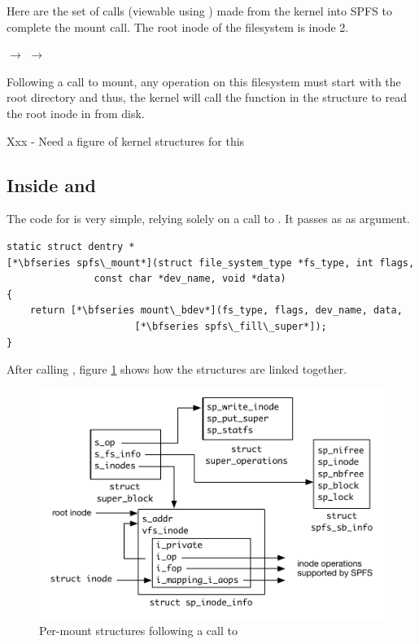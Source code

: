 Here are the set of calls (viewable using ) made from the kernel into SPFS to complete the mount call. The root inode of the filesystem is inode 2.

\small
\bigskip
{} $\rightarrow$   $\rightarrow$ 

\bigskip
\normalsize
\noindent
Following a call to mount, any operation on this filesystem must start with the root directory and thus, the kernel will call the  function in the  structure to read the root inode in from disk.

Xxx - Need a figure of kernel structures for this


\subsection{Inside  and }

The code for  is very simple, relying solely on a call to . It passes  as as argument.

\begin{lstlisting}
static struct dentry *
[*\bfseries spfs\_mount*](struct file_system_type *fs_type, int flags, 
			   const char *dev_name, void *data)
{
    return [*\bfseries mount\_bdev*](fs_type, flags, dev_name, data, 
                      [*\bfseries spfs\_fill\_super*]);
}
\end{lstlisting}

\noindent
After calling ,  figure \ref{fig:per-mount-structures} shows how the structures are linked together.

\begin{figure}
	\includegraphics[scale=0.6]{figures/sp_fill_super.pdf}
	\centering
	\caption{Per-mount structures following a call to }
	\label{fig:per-mount-structures}
\end{figure}

